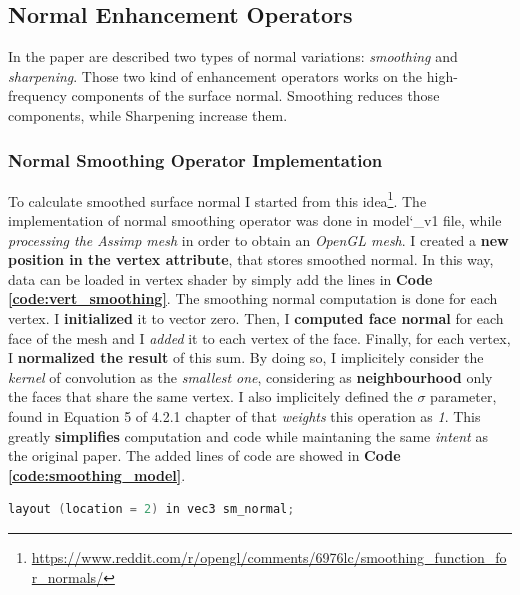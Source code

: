 \subsection{Normal Enhancement Operators}
In the paper \cite{referencePaper} are described two types of normal variations: \textit{smoothing} and \textit{sharpening}. Those two kind of enhancement operators works on the high-frequency components of the surface normal. Smoothing reduces those components, while Sharpening increase them. 
\subsubsection{Normal Smoothing Operator Implementation}
To calculate smoothed surface normal I started from this idea\footnote{\url{https://www.reddit.com/r/opengl/comments/6976lc/smoothing_function_for_normals/}}. The implementation of normal smoothing operator was done in model\char`_v1 file, while \textit{processing the Assimp mesh} in order to obtain an \textit{OpenGL mesh}. I created a \textbf{new position in the vertex attribute}, that stores smoothed normal. \newline
In this way, data can be loaded in vertex shader by simply add the lines in \textbf{Code \ref{code:vert_smoothing}}. \newline
The smoothing normal computation is done for each vertex. I \textbf{initialized} it to vector zero. Then, I \textbf{computed face normal} for each face of the mesh and I \textit{added} it to each vertex of the face. Finally, for each vertex, I \textbf{normalized the result} of this sum. \newline
By doing so, I implicitely consider the \textit{kernel} of convolution as the \textit{smallest one}, considering as \textbf{neighbourhood} only the faces that share the same vertex. I also implicitely defined the \textit{$\sigma$} parameter, found in Equation 5 of 4.2.1 chapter of \cite{referencePaper} that \textit{weights} this operation as \textit{1}. This greatly \textbf{simplifies} computation and code while maintaning the same \textit{intent} as the original paper. The added lines of code are showed in \textbf{Code \ref{code:smoothing_model}}.
\begin{lstlisting}[language=C++, caption=Smoothed normal loaded in vertex shader,label={code:vert_smoothing}]
layout (location = 2) in vec3 sm_normal;	
\end{lstlisting}
